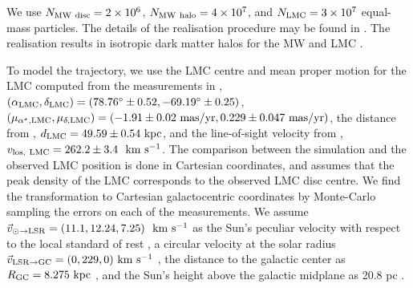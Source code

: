 \documentclass[fleqn,usenatbib]{mnras}
\newcommand{\kms}{{\rm ~km~s^{-1}}}	%
\begin{document}
We use $N_{\rm MW~disc}=2\times10^6$, $N_{\rm MW~halo}=4\times10^7$, and $N_{\rm LMC}=3\times10^7$ equal-mass particles. The details of the realisation procedure may be found in \citet{Petersen_2021_commensurabilities}. The realisation results in isotropic dark matter halos for the MW and LMC \citep[as in Model 1 of][]{Besla_2019}.

To model the trajectory, we use the LMC centre and mean proper motion for the LMC computed from the measurements in \citet{Kallivayalil_2013}, \(\left(\alpha_{\rm LMC},\delta_{\rm LMC}\right)=\left(78.76^\circ\pm0.52,-69.19^\circ\pm0.25\right)\), \(\left(\mu_{\alpha^\star,{\rm LMC}},\mu_{\delta,{\rm LMC}}\right)=\left(-1.91\pm0.02~{\rm mas/yr},0.229\pm0.047~{\rm mas/yr}\right)\), the distance from \citet{Pietrzynski_2019}, \(d_{\rm LMC} = 49.59\pm0.54~{\rm kpc}\), and the line-of-sight velocity from \citet{vanderMarel_2002}, \(v_{\rm los,~LMC}=262.2\pm3.4~\kms\). The comparison between the simulation and the observed LMC position is done in Cartesian coordinates, and assumes that the peak density of the LMC corresponds to the observed LMC disc centre.
We find the transformation to Cartesian galactocentric coordinates by Monte-Carlo sampling the errors on each of the measurements. We assume $\vec{v}_{\odot\to{\rm LSR}} = (11.1,12.24,7.25)~\kms$ as the Sun’s peculiar velocity with respect to the local standard of rest \citep{Schonrich..2010}, a circular velocity at the solar radius $\vec{v}_{{\rm LSR}\to{\rm GC}}=(0,229,0)\kms$ \citep{Eilers..2019}, the distance to the galactic center as $R_{\rm GC}=8.275~{\rm kpc}$ \citep{Gravity..2021}, and the Sun's height above the galactic midplane as 20.8 pc \citep{Bennett..2019}.
\end{document}
